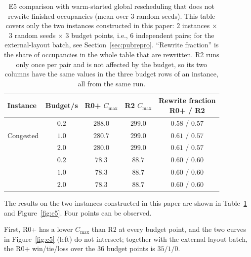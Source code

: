 \documentclass[manuscript,screen,review]{acmart}
\newcommand{\EfivePts}{36}          %
\newcommand{\EfiveWLT}{35/1/0}      %
\begin{document}
\begin{table}[t]
\centering
\caption{E5 comparison with warm-started global rescheduling that does not rewrite finished occupancies (mean over \(3\) random seeds).
This table covers only the two instances constructed in this paper: \(2\) instances \(\times\) \(3\) random seeds \(\times\) \(3\) budget points, i.e., \(6\) independent pairs;
for the external-layout batch, see Section~\ref{sec:pubrepro}. ``Rewrite fraction'' is the share of occupancies in the whole table that are rewritten.
R2 runs only once per pair and is not affected by the budget, so its two columns have the same values in the three budget rows of an instance, all from the same run.}
\label{tab:e5}
\small
\begin{tabular}{@{}lcccc@{}}
\toprule
Instance & Budget/s & R0+ \(C_{\max}\) & R2 \(C_{\max}\) & \makecell{Rewrite fraction\\R0+ / R2} \\
\midrule
\multirow{3}{*}{Congested}
 & \(0.2\) & \(288.0\) & \(299.0\) & \(0.58\) / \(0.57\) \\
 & \(1.0\) & \(280.7\) & \(299.0\) & \(0.61\) / \(0.57\) \\
 & \(2.0\) & \(280.0\) & \(299.0\) & \(0.61\) / \(0.57\) \\
\addlinespace[2pt]
\multirow{3}{*}{Small}
 & \(0.2\) & \(78.3\)  & \(88.7\)  & \(0.60\) / \(0.60\) \\
 & \(1.0\) & \(78.3\)  & \(88.7\)  & \(0.60\) / \(0.60\) \\
 & \(2.0\) & \(78.3\)  & \(88.7\)  & \(0.60\) / \(0.60\) \\
\bottomrule
\end{tabular}
\end{table}

The results on the two instances constructed in this paper are shown in Table~\ref{tab:e5} and Figure~\ref{fig:e5}. Four points can be observed.

First, R0+ has a lower \(C_{\max}\) than R2 at every budget point, and the two curves in Figure~\ref{fig:e5} (left) do not intersect;
together with the external-layout batch, the R0+ win/tie/loss over the \(\EfivePts\) budget points is \(\EfiveWLT\).
\end{document}
